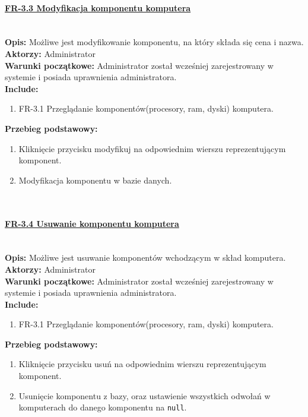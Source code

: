 \paragraph{\underline{FR-3.3 Modyfikacja komponentu komputera}}\mbox{}\\[1mm]
	\noindent\textbf{Opis:} Możliwe jest modyfikowanie komponentu, na który składa się cena i nazwa.\\
	\noindent\textbf{Aktorzy:} Administrator\\
	\textbf{Warunki początkowe:} Administrator został wcześniej zarejestrowany w systemie i posiada uprawnienia administratora.\\
	\textbf{Include:} 
	\begin{enumerate}[noparskip]
		\item FR-3.1 Przeglądanie komponentów(procesory, ram, dyski) komputera.
	\end{enumerate}
  \textbf{Przebieg podstawowy:}
	\begin{enumerate}[noparskip]
		\item Kliknięcie przycisku modyfikuj na odpowiednim wierszu reprezentującym komponent.
		\item Modyfikacja komponentu w bazie danych.
  \end{enumerate} \mbox{}\\[-11mm]

\paragraph{\underline{FR-3.4 Usuwanie komponentu komputera}}\mbox{}\\[1mm]
	\noindent\textbf{Opis:} Możliwe jest usuwanie komponentów wchodzącym w skład komputera.\\
	\noindent\textbf{Aktorzy:} Administrator\\
	\textbf{Warunki początkowe:} Administrator został wcześniej zarejestrowany w systemie i posiada uprawnienia administratora.\\
	\textbf{Include:} 
	\begin{enumerate}[noparskip]
		\item FR-3.1 Przeglądanie komponentów(procesory, ram, dyski) komputera.
	\end{enumerate}
    \textbf{Przebieg podstawowy:}
	\begin{enumerate}[noparskip]
		\item Kliknięcie przycisku usuń na odpowiednim wierszu reprezentującym komponent.
		\item Usunięcie komponentu z bazy, oraz ustawienie wszystkich odwołań w komputerach do danego komponentu na \texttt{null}.
  \end{enumerate} \mbox{}\\[-11mm]

